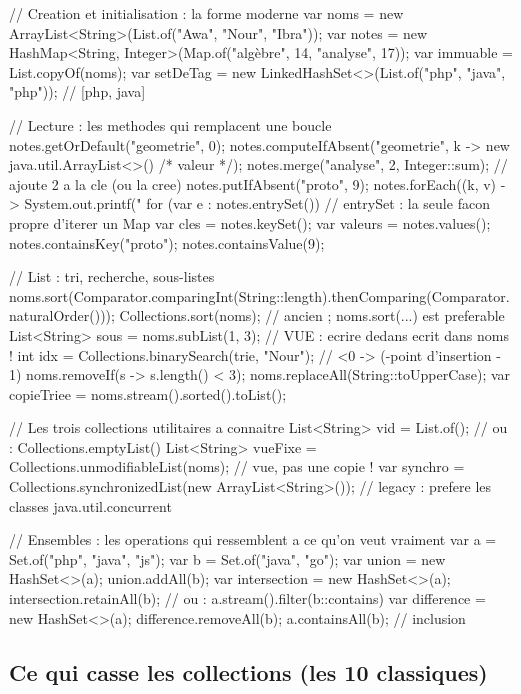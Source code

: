 \begin{codejava}
// Creation et initialisation : la forme moderne
var noms = new ArrayList<String>(List.of("Awa", "Nour", "Ibra"));
var notes = new HashMap<String, Integer>(Map.of("alg\`ebre", 14, "analyse", 17));
var immuable = List.copyOf(noms);
var setDeTag = new LinkedHashSet<>(List.of("php", "java", "php"));   // [php, java]

// Lecture : les methodes qui remplacent une boucle
notes.getOrDefault("geometrie", 0);
notes.computeIfAbsent("geometrie", k -> new java.util.ArrayList<>() /* valeur */);
notes.merge("analyse", 2, Integer::sum);                 // ajoute 2 a la cle (ou la cree)
notes.putIfAbsent("proto", 9);
notes.forEach((k, v) -> System.out.printf("%
for (var e : notes.entrySet()) { }                        // entrySet : la seule facon propre d'iterer un Map
var cles = notes.keySet(); var valeurs = notes.values();
notes.containsKey("proto"); notes.containsValue(9);

// List : tri, recherche, sous-listes
noms.sort(Comparator.comparingInt(String::length).thenComparing(Comparator.naturalOrder()));
Collections.sort(noms);                                    // ancien ; noms.sort(...) est preferable
List<String> sous = noms.subList(1, 3);                     // VUE : ecrire dedans ecrit dans noms !
int idx = Collections.binarySearch(trie, "Nour");            // <0 -> (-point d'insertion - 1)
noms.removeIf(s -> s.length() < 3);
noms.replaceAll(String::toUpperCase);
var copieTriee = noms.stream().sorted().toList();

// Les trois collections utilitaires a connaitre
List<String> vid = List.of();                              // ou : Collections.emptyList()
List<String> vueFixe = Collections.unmodifiableList(noms); // vue, pas une copie !
var synchro = Collections.synchronizedList(new ArrayList<String>());  // legacy : prefere les classes java.util.concurrent

// Ensembles : les operations qui ressemblent a ce qu'on veut vraiment
var a = Set.of("php", "java", "js");
var b = Set.of("java", "go");
var union = new HashSet<>(a); union.addAll(b);
var intersection = new HashSet<>(a); intersection.retainAll(b);   // ou : a.stream().filter(b::contains)
var difference = new HashSet<>(a); difference.removeAll(b);
a.containsAll(b);                                            // inclusion
\end{codejava}

\subsection{Ce qui casse les collections (les 10 classiques)}

